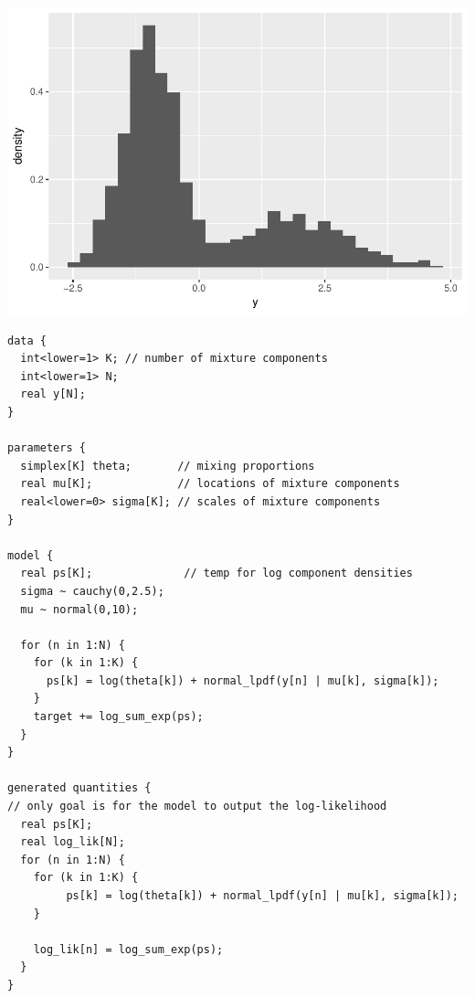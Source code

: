 \begin{frame}
\begin{analysis}

\bigskip

\bigskip

\begin{center}
\includegraphics[width=0.70\linewidth]{../LectureAssets/L07/fmDataset}
\end{center}

\bigskip

\end{analysis}
\end{frame}

\begin{frame}[fragile]
\begin{analysis}

{\fontsize{5}{5} \selectfont
\begin{center}
\begin{verbatim}
data {
  int<lower=1> K; // number of mixture components
  int<lower=1> N;
  real y[N];
}

parameters {
  simplex[K] theta;       // mixing proportions
  real mu[K];             // locations of mixture components
  real<lower=0> sigma[K]; // scales of mixture components
}

model {
  real ps[K];              // temp for log component densities
  sigma ~ cauchy(0,2.5);
  mu ~ normal(0,10);
  
  for (n in 1:N) {
    for (k in 1:K) {
      ps[k] = log(theta[k]) + normal_lpdf(y[n] | mu[k], sigma[k]);
    } 
    target += log_sum_exp(ps);
  }
}

generated quantities {
// only goal is for the model to output the log-likelihood
  real ps[K];
  real log_lik[N];
  for (n in 1:N) {
    for (k in 1:K) {
         ps[k] = log(theta[k]) + normal_lpdf(y[n] | mu[k], sigma[k]);
    }
  
    log_lik[n] = log_sum_exp(ps);
  }
}
\end{verbatim}
\end{center}}

\end{analysis}
\end{frame}


